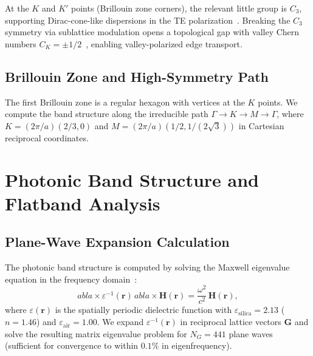 \documentclass[10pt,letterpaper]{article}
\begin{document}
At the $K$ and $K'$ points (Brillouin zone corners), the relevant little group is $C_3$, supporting Dirac-cone-like dispersions in the TE polarization~\cite{Wu2017}. Breaking the $C_3$ symmetry via sublattice modulation opens a topological gap with valley Chern numbers $C_K = \pm 1/2$~\cite{Ozawa2019,Hafezi2013}, enabling valley-polarized edge transport.

\subsection{Brillouin Zone and High-Symmetry Path}

The first Brillouin zone is a regular hexagon with vertices at the $K$ points. We compute the band structure along the irreducible path $\Gamma \to K \to M \to \Gamma$, where $K = (2\pi/a)(2/3, 0)$ and $M = (2\pi/a)(1/2, 1/(2\sqrt{3}))$ in Cartesian reciprocal coordinates.


\section{Photonic Band Structure and Flatband Analysis}
\label{sec:bandstructure}

\subsection{Plane-Wave Expansion Calculation}

The photonic band structure is computed by solving the Maxwell eigenvalue equation in the frequency domain~\cite{Joannopoulos2008}:
\begin{equation}

abla \times \varepsilon^{-1}(\mathbf{r})\,
abla \times \mathbf{H}(\mathbf{r}) = \frac{\omega^2}{c^2}\,\mathbf{H}(\mathbf{r}),
\label{eq:maxwell}
\end{equation}
where $\varepsilon(\mathbf{r})$ is the spatially periodic dielectric function with $\varepsilon_\mathrm{silica} = 2.13$ ($n = 1.46$) and $\varepsilon_\mathrm{air} = 1.00$. We expand $\varepsilon^{-1}(\mathbf{r})$ in reciprocal lattice vectors $\mathbf{G}$ and solve the resulting matrix eigenvalue problem for $N_G = 441$ plane waves (sufficient for convergence to within $0.1\%$ in eigenfrequency).
\end{document}
